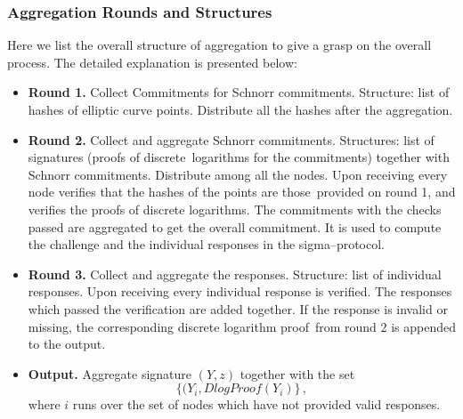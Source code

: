\subsubsection{Aggregation Rounds and Structures}
Here we list the overall structure of aggregation to give a grasp on the overall process.
The detailed explanation is presented below:
\begin{itemize}
    \item [] \textbf{Round 1.} Collect Commitments for Schnorr commitments.
    Structure: list of hashes of elliptic curve points.
    Distribute all the hashes after the aggregation.
    \item [] \textbf{Round 2.} Collect and aggregate Schnorr commitments.
    Structures: list of signatures (proofs of discrete\
    logarithms for the commitments) together with Schnorr commitments.
    Distribute among all the nodes.
    Upon receiving every node verifies that the hashes of the points are those\
    provided on round 1, and verifies the proofs of discrete logarithms.
    The commitments with the checks passed are aggregated to get the overall commitment.
    It is used to compute the challenge and the individual responses in
    the sigma--protocol.
    \item [] \textbf{Round 3.} Collect and aggregate the responses.
    Structure: list of individual responses.
    Upon receiving every individual response is verified.
    The responses which passed the verification are added together.
    If the response is invalid or missing, the corresponding discrete logarithm proof\
    from round 2 is appended to the output.

    \item [] \textbf{Output.} Aggregate signature $(Y,z)$ together with the set\
    \[
        \{(Y_i, DlogProof(Y_i)\}\,,
    \]
    where $i$ runs over the set of nodes which have not provided valid responses.
\end{itemize}

